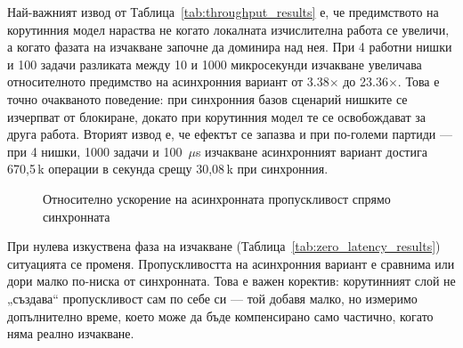 Най-важният извод от Таблица~\ref{tab:throughput_results} е, че предимството на корутинния модел нараства не когато локалната изчислителна работа се увеличи, а когато фазата на изчакване започне да доминира над нея. При 4 работни нишки и 100 задачи разликата между 10 и 1000 микросекунди изчакване увеличава относителното предимство на асинхронния вариант от 3.38$\times$ до 23.36$\times$. Това е точно очакваното поведение: при синхронния базов сценарий нишките се изчерпват от блокиране, докато при корутинния модел те се освобождават за друга работа. Вторият извод е, че ефектът се запазва и при по-големи партиди --- при 4 нишки, 1000 задачи и 100~$\mu$s изчакване асинхронният вариант достига 670{,}5\,k операции в секунда срещу 30{,}08\,k при синхронния.

\begin{figure}[H]
\centering
{}
\caption{Относително ускорение на асинхронната пропускливост спрямо синхронната}
\label{fig:async_speedup}
\end{figure}

При нулева изкуствена фаза на изчакване (Таблица~\ref{tab:zero_latency_results}) ситуацията се променя. Пропускливостта на асинхронния вариант е сравнима или дори малко по-ниска от синхронната. Това е важен коректив: корутинният слой не „създава“ пропускливост сам по себе си --- той добавя малко, но измеримо допълнително време, което може да бъде компенсирано само частично, когато няма реално изчакване.

